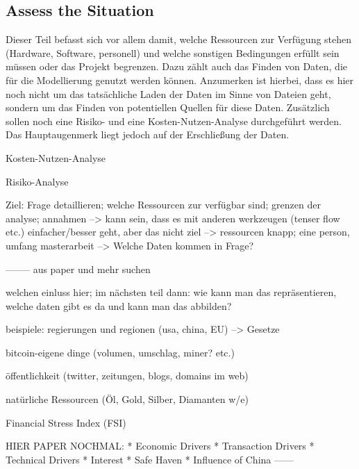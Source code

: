 \subsection{Assess the Situation}
Dieser Teil befasst sich vor allem damit, welche Ressourcen zur Verfügung stehen (Hardware, Software, personell) und welche sonstigen Bedingungen erfüllt sein müssen oder das Projekt begrenzen. Dazu zählt auch das Finden von Daten, die für die Modellierung genutzt werden können. Anzumerken ist hierbei, dass es hier noch nicht um das tatsächliche Laden der Daten im Sinne von Dateien geht, sondern um das Finden von potentiellen Quellen für diese Daten. Zusätzlich sollen noch eine Risiko- und eine Kosten-Nutzen-Analyse durchgeführt werden. Das Hauptaugenmerk liegt jedoch auf der Erschließung der Daten. \newline







Kosten-Nutzen-Analyse

Risiko-Analyse

Ziel: Frage detaillieren; welche Ressourcen zur verfügbar sind; grenzen der analyse; annahmen
--> kann sein, dass es mit anderen werkzeugen (tenser flow etc.) einfacher/besser geht, aber das nicht ziel
--> ressourcen knapp; eine person, umfang masterarbeit
--> Welche Daten kommen in Frage?

--------
aus paper und mehr suchen

welchen einluss hier; im nächsten teil dann:
wie kann man das repräsentieren, welche daten gibt es da und kann man das abbilden?

beispiele:
regierungen und regionen (usa, china, EU) --> Gesetze

bitcoin-eigene dinge (volumen, umschlag, miner? etc.)

öffentlichkeit (twitter, zeitungen, blogs, domains im web)

natürliche Ressourcen (Öl, Gold, Silber, Diamanten w/e)

Financial Stress Index (FSI)


HIER PAPER NOCHMAL:
* Economic Drivers
* Transaction Drivers
* Technical Drivers
* Interest
* Safe Haven
* Influence of China
------

